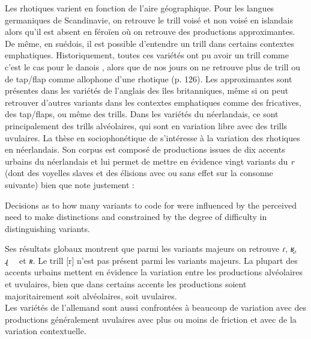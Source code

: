 Les rhotiques varient en fonction de l'aire géographique. Pour les langues germaniques de Scandinavie, on retrouve le trill voisé et non voisé en islandais alors qu'il est absent en féroïen où on retrouve des productions approximantes. De même, en suédois, il est possible d'entendre un trill dans certains contextes emphatiques. Historiquement, toutes ces variétés ont pu avoir un trill comme c'est le cas pour le danois \parencite[218]{basbollPhonologyDanish2005}, alors que de nos jours on ne retrouve plus de trill ou de tap/flap comme allophone d'une rhotique (p. 126).
Les approximantes sont présentes dans les variétés de l'anglais des îles britanniques, même si on peut retrouver d'autres variants dans les contextes emphatiques comme des fricatives, des tap/flaps, ou même des trills.
Dans les variétés du néerlandais, ce sont principalement des trills alvéolaires, qui sont en variation libre avec des trills uvulaires. La thèse en sociophonétique de \textcite{sebregtsSociophoneticsPhonologyDutch2014} s'intéresse à la variation des rhotiques en néerlandais. Son corpus est composé de productions issues de dix accents urbains du néerlandais et lui permet de mettre en évidence vingt variants du \textit{r} (dont des voyelles slaves et des élisions avec ou sans effet sur la consonne suivante) bien que \citeauthor{sebregtsSociophoneticsPhonologyDutch2014} note justement :

\begin{displayquote}
	Decisions as to how many variants to code for were influenced by the perceived need to make distinctions and constrained by the degree of difficulty in distinguishing variants. \parencite[284]{sebregtsSociophoneticsPhonologyDutch2014}
\end{displayquote}

Ses résultats globaux montrent que parmi les variants majeurs on retrouve \textit{ɾ}, \textit{ʁ̞}, \textit{ɻ}~~ et \textit{ʀ}. Le trill [r] n'est pas présent parmi les variants majeurs. La plupart des accents urbains mettent en évidence la variation entre les productions alvéolaires et uvulaires, bien que dans certains accents les productions soient majoritairement soit alvéolaires, soit uvulaires.\\

Les variétés de l'allemand sont aussi confrontées à beaucoup de variation avec des productions généralement uvulaires avec plus ou moins de friction et avec de la variation contextuelle. \\

